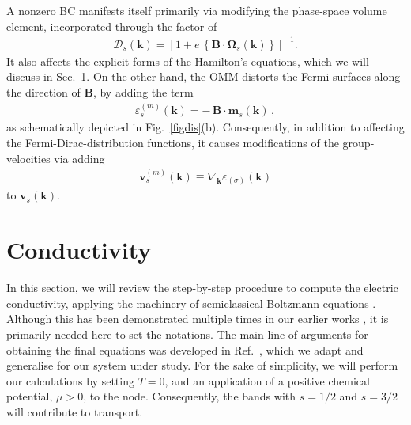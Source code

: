 \documentclass[aps,prb,onecolumn,nofootinbib,citeautoscript,10pt, showkeys]{revtex4-2}
\begin{document}
A nonzero BC manifests itself primarily via modifying the phase-space volume element, incorporated through the factor of \cite{mermin, sundaram99_wavepacket, li2023_planar, ips-kush-review, ips-rsw-ph, ips-shreya}
\begin{align}
{\mathcal D}_{s}  (\boldsymbol k) = \left [1 
+ e \,  \left \lbrace 
{\boldsymbol B} \cdot \boldsymbol{\Omega}_s  (\boldsymbol k)
\right \rbrace  \right ]^{-1}.
\end{align}
It also affects the explicit forms of the Hamilton's equations, which we will discuss in Sec.~\ref{secboltz}.
On the other hand, the OMM distorts the Fermi surfaces along the direction of $\boldsymbol B$, by adding the term
\begin{align}
\label{eqmodi}
\varepsilon_s^{(m)}   (\boldsymbol k) 
= -\, {\boldsymbol B} \cdot \boldsymbol{m}_s  (\boldsymbol k) \,,
\end{align}
as schematically depicted in Fig.~\ref{figdis}(b). Consequently, in addition to affecting the Fermi-Dirac-distribution functions, it causes modifications of the group-velocities via adding
\begin{align}
 {\boldsymbol   v}_s^{(m)} ({\boldsymbol k} ) \equiv 
 \nabla_{\boldsymbol k} \varepsilon_{(\sigma)}   (\boldsymbol k) 
\end{align}
to $\boldsymbol{v}_{s}(\boldsymbol{k})$.


\section{Conductivity}
\label{secboltz}



In this section, we will review the step-by-step procedure to compute the electric conductivity, applying the machinery of semiclassical Boltzmann equations \cite{mermin, sundaram99_wavepacket, li2023_planar, ips-kush-review, ips-rsw-ph, ips-shreya, timm, ips-exact-spin1}. Although this has been demonstrated multiple times in our earlier works \cite{ips-exact-spin1, ips-exact-kwn}, it is primarily needed here to set the notations. The main line of arguments for obtaining the final equations was developed in Ref.~\cite{timm}, which we adapt and generalise for our system under study. For the sake of simplicity, we will perform our calculations by setting $ T = 0$, and an application of a positive chemical potential, $\mu>0$, to the node. Consequently, the bands with $s=1/2$ and $s=3/2$ will contribute to transport.
\end{document}
